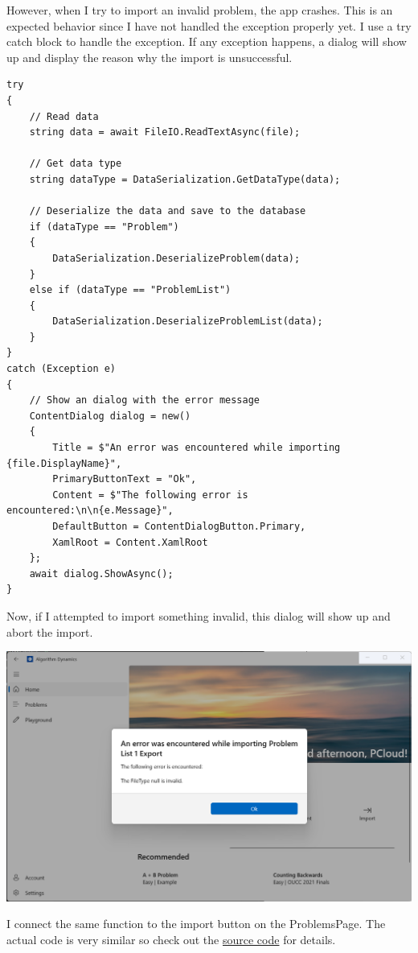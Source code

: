 \documentclass[a4paper]{report}
\begin{document}
However, when I try to import an invalid problem, the app crashes. This is an expected behavior since I have not handled the exception properly yet. I use a try catch block to handle the exception. If any exception happens, a dialog will show up and display the reason why the import is unsuccessful.

\begin{verbatim}
try
{
    // Read data
    string data = await FileIO.ReadTextAsync(file);
    
    // Get data type
    string dataType = DataSerialization.GetDataType(data);

    // Deserialize the data and save to the database
    if (dataType == "Problem")
    {
        DataSerialization.DeserializeProblem(data);
    }
    else if (dataType == "ProblemList")
    {
        DataSerialization.DeserializeProblemList(data);
    }
}
catch (Exception e)
{
    // Show an dialog with the error message
    ContentDialog dialog = new()
    {
        Title = $"An error was encountered while importing {file.DisplayName}",
        PrimaryButtonText = "Ok",
        Content = $"The following error is encountered:\n\n{e.Message}",
        DefaultButton = ContentDialogButton.Primary,
        XamlRoot = Content.XamlRoot
    };
    await dialog.ShowAsync();
}
\end{verbatim}

Now, if I attempted to import something invalid, this dialog will show up and abort the import.

\includegraphics[width=\textwidth, height=\textheight, keepaspectratio]{HomePage-Import-Error}

I connect the same function to the import button on the ProblemsPage. The actual code is very similar so check out the \hyperref[subsubsec:problemspage]{source code} for details.
\end{document}
